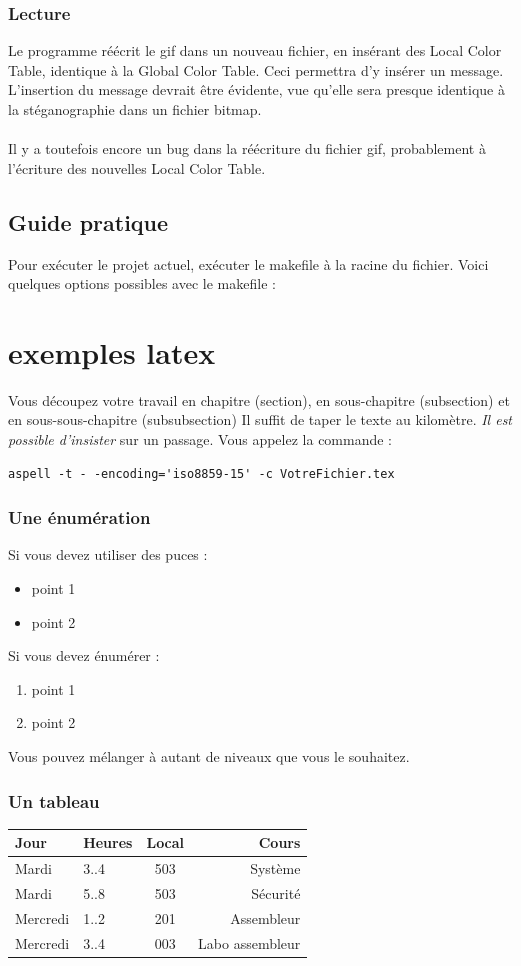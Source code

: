 \subsubsection {Lecture}
Le programme réécrit le gif dans un nouveau fichier, en insérant des Local Color Table, identique à la Global Color Table. Ceci permettra d'y insérer un message. L'insertion du message devrait être évidente, vue qu'elle sera presque identique à la stéganographie dans un fichier bitmap.\\\\
Il y a toutefois encore un bug dans la réécriture du fichier gif, probablement à l'écriture des nouvelles Local Color Table.
\subsection {Guide pratique}
Pour exécuter le projet actuel, exécuter le makefile à la racine du fichier.
Voici quelques options possibles avec le makefile : \\

\newpage
%
%
%
%
\section {exemples latex}
Vous découpez votre travail en chapitre (section), en sous-chapitre (subsection) et en sous-sous-chapitre (subsubsection)
Il suffit de taper le texte au kilomètre. \emph{Il est possible d'insister} sur un passage.
Vous appelez la commande :
\lstset{frame=trBL}
\begin{lstlisting}
aspell -t - -encoding='iso8859-15' -c VotreFichier.tex
\end{lstlisting}
\subsubsection {Une énumération}
Si vous devez utiliser des puces :
\begin{itemize}
\item point 1
\item point 2
\end{itemize}
Si vous devez énumérer :
\begin{enumerate}
\item point 1
\item point 2
\end{enumerate}
Vous pouvez mélanger à autant de niveaux que vous le souhaitez.
\subsubsection{Un tableau}
\begin{tabular}{|l|l||c||r|} %
\hline
Jour & Heures & Local & Cours \\
\hline
Mardi    &  3..4  & 503 & Système\\
Mardi    &  5..8  & 503 & Sécurité\\
\hline
Mercredi  &  1..2  &  201 & Assembleur\\
Mercredi  &  3..4  &  003 & Labo assembleur\\
\hline
\end{tabular}
